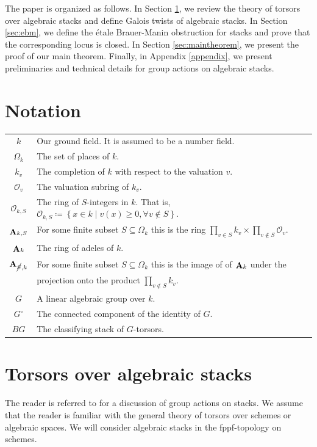 \documentclass[12pt, final]{amsart}
\theoremstyle{remark}
\theoremstyle{definition}
\theoremstyle{plain}
\newcommand{\sO}{\mathcal{O}}
\DeclareMathOperator{\bA}{{\bf A}}
\newcommand{\cS}{\cancel{S}}
\begin{document}
The paper is organized as follows. In Section \ref{sec:torsors}, we review the theory of torsors over algebraic stacks and define Galois twists of algebraic stacks. In Section \ref{sec:ebm}, we define the étale Brauer-Manin obstruction for stacks and prove that the corresponding locus is closed. In Section \ref{sec:maintheorem}, we present the proof of our main theorem. Finally, in Appendix \ref{appendix}, we present preliminaries and technical details for group actions on algebraic stacks.


\section*{Notation}


\begin{tabular}{cl}
    $k$ & Our ground field. It is assumed to be a number field.\\
    $\Omega_k$ & The set of places of $k$. \\
    $k_v$ & The completion of $k$ with respect to the valuation $v$.\\
    $\sO_v$ & The valuation subring of $k_v$.\\
    $\sO_{k,S}$ & The ring of $S$-integers in $k$. That is, $\sO_{k,S}\coloneqq \left\{x\in k \mid v(x)\geq 0, \forall v \not \in S\right\}$.\\
    $\bA_{k,S}$ & For some finite subset $S \subseteq \Omega_k$ this is the ring $\prod_{v\in S}k_v \times \prod_{v \not\in S}\sO_v$.\\
    $\bA_k$ & The ring of adeles of $k$.\\
    $\bA_{\cS,k}$ & For some finite subset $S\subseteq \Omega_k$ this is the image of of $\bA_k$ under the \\ & projection onto the product $\prod_{v\not\in S} k_v$. \\
    $G$ & A linear algebraic group over $k$. \\ 
    $G^\circ$ & The connected component of the identity of $G$. \\ 
    $BG$ & The classifying stack of $G$-torsors.
\end{tabular}



\section{Torsors over algebraic stacks}\label{sec:torsors}
The reader is referred to \cite{romagny:05} for a discussion of group actions on stacks. We assume that the reader is familiar with the general theory of torsors over schemes or algebraic spaces. 
We will consider algebraic stacks in the fppf-topology on schemes. 
\end{document}
